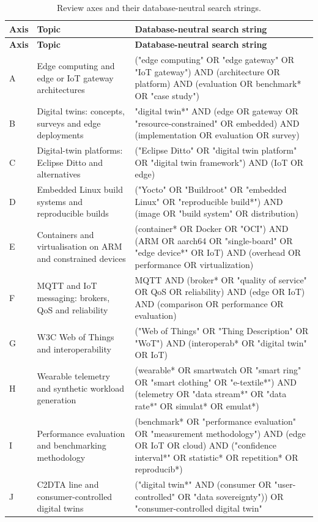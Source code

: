 \begingroup
\small{}
\begin{longtable}{@{}>{\RaggedRight\arraybackslash}p{}>{\RaggedRight\arraybackslash}p{}>{\RaggedRight\arraybackslash}p{}@{}}
\caption{Review axes and their database-neutral search strings.}\label{tab:review-axes}\\
\toprule
\textbf{Axis} & \textbf{Topic} & \textbf{Database-neutral search string} \\
\midrule\endfirsthead
\toprule
\textbf{Axis} & \textbf{Topic} & \textbf{Database-neutral search string} \\
\midrule\endhead
\bottomrule\endfoot
A & Edge computing and edge or IoT gateway architectures & ("edge computing" OR "edge gateway" OR "IoT gateway") AND (architecture OR platform) AND (evaluation OR benchmark* OR "case study") \\
\addlinespace[3pt]
B & Digital twins: concepts, surveys and edge deployments & "digital twin*" AND (edge OR gateway OR "resource-constrained" OR embedded) AND (implementation OR evaluation OR survey) \\
\addlinespace[3pt]
C & Digital-twin platforms: Eclipse Ditto and alternatives & ("Eclipse Ditto" OR "digital twin platform" OR "digital twin framework") AND (IoT OR edge) \\
\addlinespace[3pt]
D & Embedded Linux build systems and reproducible builds & ("Yocto" OR "Buildroot" OR "embedded Linux" OR "reproducible build*") AND (image OR "build system" OR distribution) \\
\addlinespace[3pt]
E & Containers and virtualisation on ARM and constrained devices & (container* OR Docker OR "OCI") AND (ARM OR aarch64 OR "single-board" OR "edge device*" OR IoT) AND (overhead OR performance OR virtualization) \\
\addlinespace[3pt]
F & MQTT and IoT messaging: brokers, QoS and reliability & MQTT AND (broker* OR "quality of service" OR QoS OR reliability) AND (edge OR IoT) AND (comparison OR performance OR evaluation) \\
\addlinespace[3pt]
G & W3C Web of Things and interoperability & ("Web of Things" OR "Thing Description" OR "WoT") AND (interoperab* OR "digital twin" OR IoT) \\
\addlinespace[3pt]
H & Wearable telemetry and synthetic workload generation & (wearable* OR smartwatch OR "smart ring" OR "smart clothing" OR "e-textile*") AND (telemetry OR "data stream*" OR "data rate*" OR simulat* OR emulat*) \\
\addlinespace[3pt]
I & Performance evaluation and benchmarking methodology & (benchmark* OR "performance evaluation" OR "measurement methodology") AND (edge OR IoT OR cloud) AND ("confidence interval*" OR statistic* OR repetition* OR reproducib*) \\
\addlinespace[3pt]
J & C2DTA line and consumer-controlled digital twins & ("digital twin*" AND (consumer OR "user-controlled" OR "data sovereignty")) OR "consumer-controlled digital twin" \\
\end{longtable}
\endgroup

